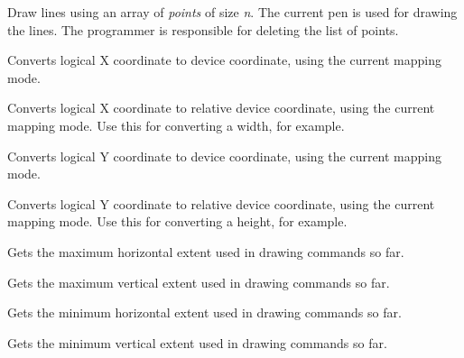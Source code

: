 Draw lines using an array of {\it points} of size {\it n}. The current pen is used
for drawing the lines.  The programmer is responsible for deleting the list of points.



Converts logical X coordinate to device coordinate, using the current
mapping mode.



Converts logical X coordinate to relative device coordinate, using the current
mapping mode. Use this for converting a width, for example.



Converts logical Y coordinate to device coordinate, using the current
mapping mode.



Converts logical Y coordinate to relative device coordinate, using the current
mapping mode. Use this for converting a height, for example.



Gets the maximum horizontal extent used in drawing commands so far.



Gets the maximum vertical extent used in drawing commands so far.



Gets the minimum horizontal extent used in drawing commands so far.



Gets the minimum vertical extent used in drawing commands so far.



